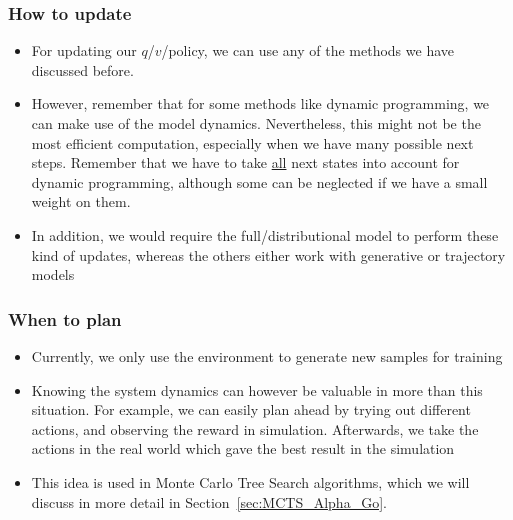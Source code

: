 \subsubsection{How to update}
\begin{itemize}
	\item For updating our $q$/$v$/policy, we can use any of the methods we have discussed before. 
	\item However, remember that for some methods like dynamic programming, we can make use of the model dynamics. Nevertheless, this might not be the most efficient computation, especially when we have many possible next steps. Remember that we have to take \underline{all} next states into account for dynamic programming, although some can be neglected if we have a small weight on them. 
	\item In addition, we would require the full/distributional model to perform these kind of updates, whereas the others either work with generative or trajectory models
\end{itemize}
\subsubsection{When to plan}
\begin{itemize}
	\item Currently, we only use the environment to generate new samples for training
	\item Knowing the system dynamics can however be valuable in more than this situation. For example, we can easily plan ahead by trying out different actions, and observing the reward in simulation. Afterwards, we take the actions in the real world which gave the best result in the simulation
	\item This idea is used in Monte Carlo Tree Search algorithms, which we will discuss in more detail in Section~\ref{sec:MCTS_Alpha_Go}. 
\end{itemize}
